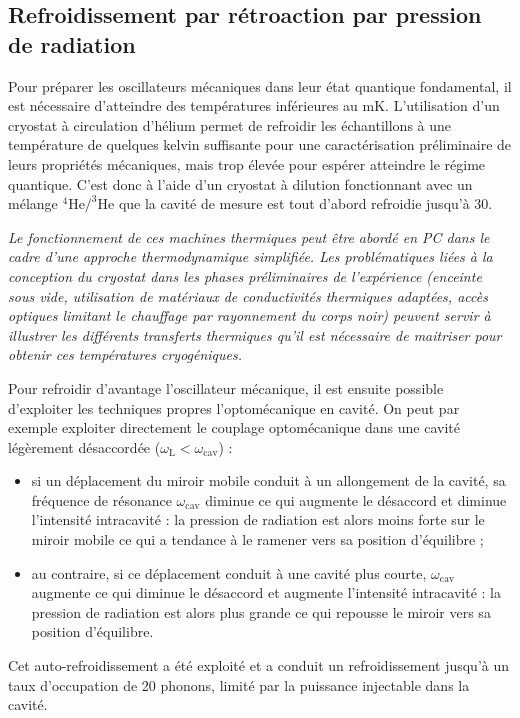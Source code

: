 \documentclass[12pt,a4paper]{article}
\begin{document}
\subsection{Refroidissement par rétroaction par pression de radiation}

Pour préparer les oscillateurs mécaniques dans leur état quantique fondamental, il est nécessaire d'atteindre des températures inférieures au mK.
L'utilisation d'un cryostat à circulation d'hélium permet de refroidir les échantillons à une température de quelques kelvin suffisante pour une caractérisation préliminaire de leurs propriétés mécaniques, mais trop élevée pour espérer atteindre le régime quantique.
C'est donc à l'aide d'un cryostat à dilution fonctionnant avec un mélange $\mathrm{^4He/^3He}$ que la cavité de mesure est tout d'abord refroidie jusqu'à \unit{30}{\milli\kelvin}.

\textit{Le fonctionnement de ces machines thermiques peut être abordé en PC dans le cadre d'une approche thermodynamique simplifiée.
Les problématiques liées à la conception du cryostat dans les phases préliminaires de l'expérience (enceinte sous vide, utilisation de matériaux de conductivités thermiques adaptées, accès optiques limitant le chauffage par rayonnement du corps noir) peuvent servir à illustrer les différents transferts thermiques qu'il est nécessaire de maitriser pour obtenir ces températures cryogéniques.}

Pour refroidir d'avantage l'oscillateur mécanique, il est ensuite possible d'exploiter les techniques propres l'optomécanique en cavité.
On peut par exemple exploiter directement le couplage optomécanique dans une cavité légèrement désaccordée ($\omega_\mathrm{L}<\omega_\mathrm{cav}$) :
\begin{itemize}
\item si un déplacement du miroir mobile conduit à un allongement de la cavité, sa fréquence de résonance $\omega_\mathrm{cav}$ diminue ce qui augmente le désaccord et diminue l'intensité intracavité : la pression de radiation est alors moins forte sur le miroir mobile ce qui a tendance à le ramener vers sa position d'équilibre ;
\item au contraire, si ce déplacement conduit à une cavité plus courte, $\omega_\mathrm{cav}$ augmente ce qui diminue le désaccord et augmente l'intensité intracavité : la pression de radiation est alors plus grande ce qui repousse le miroir vers sa position d'équilibre.
\end{itemize}
Cet auto-refroidissement a été exploité et a conduit un refroidissement jusqu'à un taux d'occupation de 20 phonons, limité par la puissance injectable dans la cavité.
\end{document}
